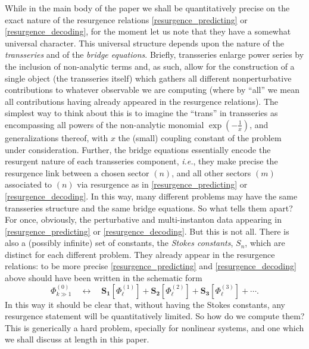 \documentclass[11pt,a4paper]{article}
\newcommand{\be}{\begin{equation}}
\newcommand{\ee}{\end{equation}}
\begin{document}
While in the main body of the paper we shall be quantitatively precise on the exact nature of the resurgence relations \eqref{resurgence_predicting} or \eqref{resurgence_decoding}, for the moment let us note that they have a somewhat universal character. This universal structure depends upon the nature of the \textit{transseries} and of the \textit{bridge equations}. Briefly, transseries enlarge  power series by the inclusion of non-analytic terms and, as such, allow for the construction of a single object (the transseries itself) which gathers all different nonperturbative contributions to whatever observable we are computing (where by ``all'' we mean all contributions having already appeared in the resurgence relations). The simplest way to think about this is to imagine the ``trans'' in transseries as encompassing all powers of the non-analytic monomial $\exp \left( - \frac{1}{x} \right)$, and generalizations thereof, with $x$ the (small) coupling constant of the problem under consideration. Further, the bridge equations essentially encode the resurgent nature of each transseries component, \textit{i.e.}, they make precise the resurgence link between a chosen sector $(n)$, and all other sectors $(m)$ associated to $(n)$ via resurgence as in \eqref{resurgence_predicting} or \eqref{resurgence_decoding}. In this way, many different problems may have the same transseries structure and the same bridge equations. So what tells them apart? For once, obviously, the perturbative and multi-instanton data appearing in \eqref{resurgence_predicting} or \eqref{resurgence_decoding}. But this is not all. There is also a (possibly infinite) set of constants, the \textit{Stokes constants}, $S_n$, which are distinct for each different problem. They already appear in the resurgence relations: to be more precise \eqref{resurgence_predicting} and \eqref{resurgence_decoding} above should have been written in the schematic form
%
\be
\label{resurgence_stokes}
\Phi^{(0)}_{k \gg 1} \quad \longleftrightarrow \quad \boldsymbol{S_1} \left[ \Phi^{(1)}_\ell \right] + \boldsymbol{S_2} \left[ \Phi^{(2)}_\ell \right] + \boldsymbol{S_3} \left[ \Phi^{(3)}_\ell \right] + \cdots.
\ee
%
\noindent
In this way it should be clear that, without having the Stokes constants, any resurgence statement will be quantitatively limited. So how do we compute them? This is generically a hard problem, specially for nonlinear systems, and one which we shall discuss at length in this paper.
\end{document}
